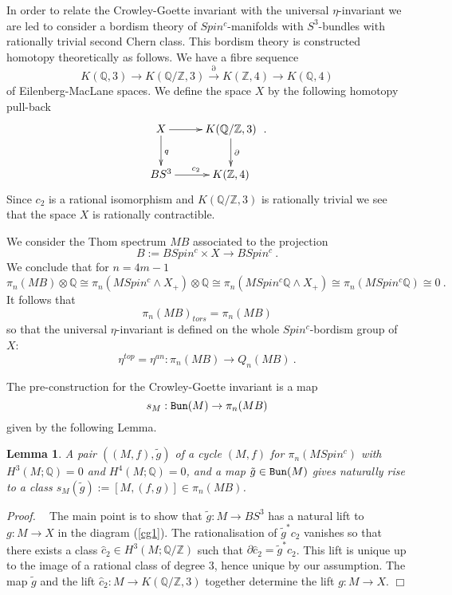 \documentclass[12pt]{article}
\newtheorem{lem}[theorem]{Lemma}
\newcommand{\Bun}{{\tt Bun}}
\def\hB{\hspace*{\fill}$\Box$ \newline\noindent}
\newcommand{\proof}{{\it Proof.$\:\:\:\:$}}
\newcommand{\Z}{{\mathbb{Z}}}
\newcommand{\Q}{{\mathbb{Q}}}
\begin{document}
In order to relate the Crowley-Goette invariant with the universal $\eta$-invariant we are led to consider a  bordism theory of $Spin^{c}$-manifolds with $S^{3}$-bundles with rationally trivial second Chern class. 
This bordism theory is constructed homotopy theoretically  as follows.
We have a fibre sequence 
$$ K(\Q,3)\to K(\Q/\Z,3) \stackrel{\partial}{\to} K(\Z,4)\to K(\Q,4)$$
of Eilenberg-MacLane spaces. We define the space $X$ by the following homotopy pull-back
\begin{equation}\label{cg1}\xymatrix{X\ar[d]^{q}\ar[r]&K(\Q/\Z,3)\ar[d]^{\partial}\\
BS^{3}\ar[r]^{c_{2}}&K(\Z,4)}\ .\end{equation}
Since $c_{2}$ is a rational isomorphism and $K(\Q/\Z,3)$ is rationally trivial we see that the space $X$ is rationally contractible. 

We consider the Thom spectrum $MB$ associated to the projection $$B:=BSpin^{c}\times X\to BSpin^{c}\ .$$  We conclude that for $n=4m-1$
$$\pi_{n}(MB)\otimes \Q\cong \pi_{n}(MSpin^{c}\wedge X_{+})\otimes \Q\cong \pi_{n}(MSpin^{c}\Q\wedge X_{+})\cong  \pi_{n}(MSpin^{c}\Q)\cong 0\ .$$
It follows that
$$\pi_{n}(MB)_{tors}=\pi_{n}(MB)$$ 
so that the universal $\eta$-invariant is defined on the whole $Spin^{c}$-bordism group of $X$: 
$$\eta^{top}=\eta^{an}:\pi_{n}(MB)\to Q_{n}(MB)\ .$$

  The pre-construction for the Crowley-Goette invariant is a map 
 $$s_{M}:\Bun(M)\to \pi_{n}(MB) $$
 given by the following Lemma.
 \begin{lem}\label{lemcg5}
A pair $((M,f),\tilde g)$ of  a cycle $(M,f)$ for $\pi_{n}(MSpin^{c})$     with $H^{3}(M;\Q)=0$ and $H^{4}(M;\Q)=0$,  and a map $\tilde g\in \Bun(M)$ gives naturally rise to a class
$s_{M}(\tilde g):=[M,(f,g)]\in \pi_{n}(MB)$. 
\end{lem}
\proof
The main point is to show that $\tilde g:M\to BS^{3}$ has a natural lift to $g:M\to X$ in the diagram
(\ref{cg1}).
The rationalisation of $\tilde g^{*}c_{2}$ vanishes so that there exists a class
$\hat c_{2}\in H^{3}(M;\Q/\Z)$ such that $\partial \hat c_{2}=\tilde g^{* }c_{2}$.
This lift is unique up to the image of a rational class of degree $3$, hence unique by our assumption.
The map
$\tilde g$ and the lift $\hat c_{2}:M\to K(\Q/\Z,3)$ together determine the lift $g:M\to X$.
 \hB
 
\end{document}
